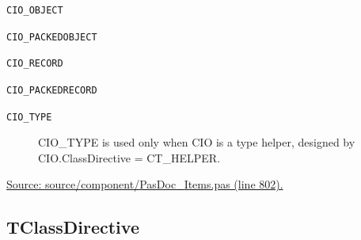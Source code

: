 \documentclass{report}
\newif\ifpdf
\begin{document}
\begin{list}{}
\begin{description}
\item[\texttt{CIO{\_}OBJECT}] \label{PasDoc_Items-CIO_OBJECT}
\index{}
 
\item[\texttt{CIO{\_}PACKEDOBJECT}] \label{PasDoc_Items-CIO_PACKEDOBJECT}
\index{}
 
\item[\texttt{CIO{\_}RECORD}] \label{PasDoc_Items-CIO_RECORD}
\index{}
 
\item[\texttt{CIO{\_}PACKEDRECORD}] \label{PasDoc_Items-CIO_PACKEDRECORD}
\index{}
 
\item[\texttt{CIO{\_}TYPE}] \label{PasDoc_Items-CIO_TYPE}
\index{}
CIO{\_}TYPE is used only when CIO is a type helper, designed by CIO.ClassDirective = CT{\_}HELPER.
\end{description}
\par
\href{https://github.com/pasdoc/pasdoc/blob/master/source/component/PasDoc_Items.pas#L802}{Source: source/component/PasDoc{\_}Items.pas (line 802).}

\end{list}
\ifpdf
\subsection*{\large{\textbf{TClassDirective}}\normalsize\hspace{1ex}\hrulefill}
\else
\end{document}
